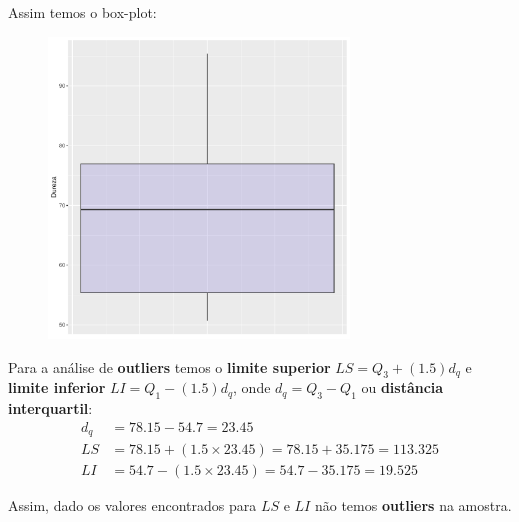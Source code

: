 \begin{parts}
\begin{solution}
        Assim temos o box-plot:
        \begin{figure}[H]
            \centering
            \includegraphics[width=8cm]{./../src/output/03212024_Output_BoxPlotDurezaAluminio.pdf}
        \end{figure}

        Para a análise de \textbf{outliers} temos o \textbf{limite superior} $LS = Q_3 + (1.5)d_q$ e \textbf{limite inferior} $LI = Q_1 - (1.5)d_q$, onde $d_q = Q_3 - Q_1$ ou \textbf{distância interquartil}:
        \begin{equation*}
            \begin{split}
                d_q & = 78.15 - 54.7 = 23.45                                  \\
                LS  & = 78.15 + (1.5 \times 23.45) = 78.15 + 35.175 = 113.325 \\
                LI  & = 54.7 - (1.5 \times 23.45) = 54.7 - 35.175 = 19.525
            \end{split}
        \end{equation*}

        Assim, dado os valores encontrados para $LS$ e $LI$ não temos \textbf{outliers} na amostra.
    \end{solution}
\end{parts}